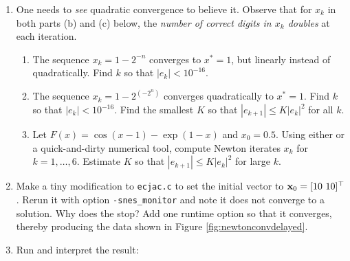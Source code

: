 \renewcommand{\labelenumi}{\arabic{chapter}.\arabic{enumi}\quad}
\renewcommand{\labelenumii}{(\alph{enumii})}
\begin{enumerate}
\item \label{exer:nl:seeittobelieveit} One needs to \emph{see} quadratic convergence to believe it.  Observe that for $x_k$ in both parts (b) and (c) below, the \emph{number of correct digits in $x_k$ doubles} at each iteration.
    \begin{enumerate}
    \item The sequence $x_k = 1-2^{-n}$ converges to $x^*=1$, but linearly instead of quadratically.  Find $k$ so that $|e_k| < 10^{-16}$.
    \item The sequence $x_k = 1-2^{(-2^n)}$ converges quadratically to $x^*=1$.  Find $k$ so that $|e_k| < 10^{-16}$.  Find the smallest $K$ so that $|e_{k+1}| \le K |e_k|^2$ for all $k$.
    \item Let $F(x) = \cos(x-1) - \exp(1-x)$ and $x_0=0.5$.  Using either \PETSc or a quick-and-dirty numerical tool, compute Newton iterates $x_k$ for $k=1,\dots,6$.  Estimate $K$ so that $|e_{k+1}| \le K |e_k|^2$ for large $k$.
    \end{enumerate}

\item Make a tiny modification to \texttt{ecjac.c} to set the initial vector to $\mathbf{x}_0 = [10\,\, 10]^\top$.  Rerun it with option \texttt{-snes\_monitor} and note it does not converge to a solution.  Why does the \pSNES stop?  Add one runtime option so that it converges, thereby producing the data shown in Figure \ref{fig:newtonconvdelayed}.

\item \label{exer:nl:snestestdisplay}  Run and interpret the result:


\end{enumerate}
